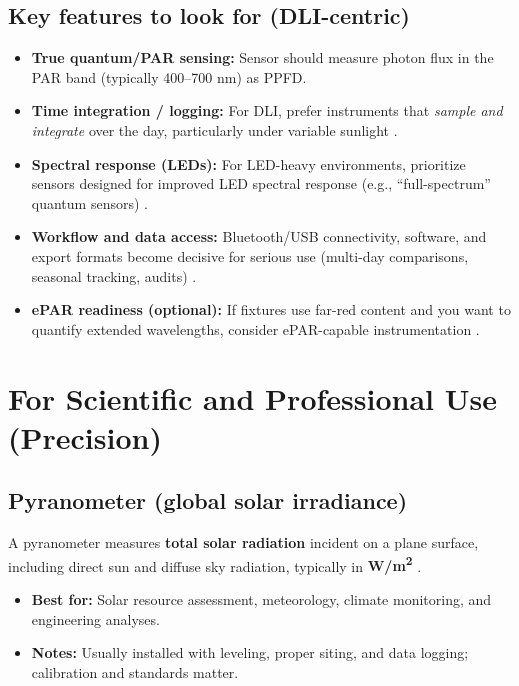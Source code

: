 \documentclass[11pt]{article}
\begin{document}
\subsection{Key features to look for (DLI-centric)}
\begin{itemize}
  \item \textbf{True quantum/PAR sensing:} Sensor should measure photon flux in the PAR band (typically 400--700 nm) as PPFD.
  \item \textbf{Time integration / logging:} For DLI, prefer instruments that \emph{sample and integrate} over the day, particularly under variable sunlight \cite{apogee_dli_measuring,licor_calculating_dli}.
  \item \textbf{Spectral response (LEDs):} For LED-heavy environments, prioritize sensors designed for improved LED spectral response (e.g., ``full-spectrum'' quantum sensors) \cite{apogee_mq500_page}.
  \item \textbf{Workflow and data access:} Bluetooth/USB connectivity, software, and export formats become decisive for serious use (multi-day comparisons, seasonal tracking, audits) \cite{apogee_pq500,licor_li1500_product}.
  \item \textbf{ePAR readiness (optional):} If fixtures use far-red content and you want to quantify extended wavelengths, consider ePAR-capable instrumentation \cite{apogee_pq612}.
\end{itemize}

\section{For Scientific and Professional Use (Precision)}
\subsection{Pyranometer (global solar irradiance)}
A pyranometer measures \textbf{total solar radiation} incident on a plane surface, including direct sun and diffuse sky radiation, typically in \textbf{W/m\textsuperscript{2}} \cite{hukseflux_instrument_select,noaa_instruments}.
\begin{itemize}
  \item \textbf{Best for:} Solar resource assessment, meteorology, climate monitoring, and engineering analyses.
  \item \textbf{Notes:} Usually installed with leveling, proper siting, and data logging; calibration and standards matter.
\end{itemize}
\end{document}
